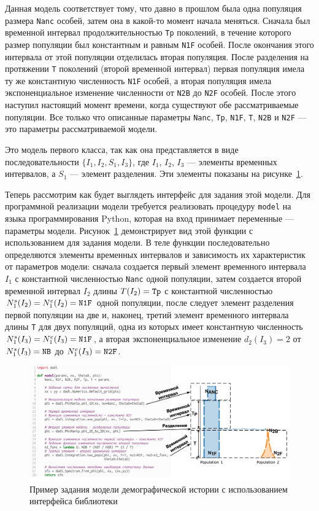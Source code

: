 \documentclass[a4paper,14pt,oneside,openany,article]{memoir}
\begin{document}
Данная модель соответствует тому, что давно в прошлом была одна популяция размера \texttt{Nanc} особей, затем она в какой-то момент начала меняться.
Сначала был временной интервал продолжительностью \texttt{Tp} поколений, в течение которого размер популяции был константным и равным \texttt{N1F} особей.
После окончания этого интервала от этой популяции отделилась вторая популяция.
После разделения на протяжении \texttt{T} поколений (второй временной интервал) первая популяция имела ту же константную численность \texttt{N1F} особей, а вторая популяция имела экспоненциальное изменение численности от \texttt{N2B} до \texttt{N2F} особей.
После этого наступил настоящий момент времени, когда существуют обе рассматриваемые популяции.
Все только что описанные параметры \texttt{Nanc}, \texttt{Tp}, \texttt{N1F}, \texttt{T}, \texttt{N2B} и \texttt{N2F} --- это параметры рассматриваемой модели.

Это модель первого класса, так как она представляется в виде последовательности $\{I_1, I_2, S_1, I_3\}$, где $I_1$, $I_2$, $I_3$ --- элементы временных интервалов, а $S_1$ --- элемент разделения.
Эти элементы показаны на рисунке~\ref{fig:dadi:model_spec}.

Теперь рассмотрим как будет выглядеть интерфейс \dadi для задания этой модели.
Для программной реализации модели требуется реализовать процедуру \texttt{model} на языка программирования Python, которая на вход принимает переменные --- параметры модели.
Рисунок~\ref{fig:dadi:model_spec} демонстрирует вид этой функции с использованием \dadi для задания модели.
В теле функции последовательно определяются элементы временных интервалов и зависимость их характеристик от параметров модели: сначала создается первый элемент временного интервала $I_1$ с константной численностью \texttt{Nanc} одной популяции, затем создается второй временной интервал $I_2$ длины $T(I_2) = \text{\texttt{Tp}}$ с константной численностью $N_1^s(I_2) = N_1^e(I_2) = \text{\texttt{N1F}}$ одной популяции, после следует элемент разделения первой популяции на две и, наконец, третий элемент временного интервала длины \texttt{T} для двух популяций, одна из которых имеет константную численность $N_1^s(I_3) = N_1^e(I_3) = \text{\texttt{N1F}}$, а вторая экспоненциальное изменение $d_2(I_3) = 2$ от $N_1^s(I_3) = \text{\texttt{NB}}$ до $N_1^e(I_3) = \text{\texttt{N2F}}$.
\begin{figure}[h]
    \centering
    \includegraphics[width=\linewidth]{images_2/dadi_model.pdf}
    \caption{Пример задания модели демографической истории с использованием интерфейса библиотеки~\dadi}
    \label{fig:dadi:model_spec}
\end{figure}
\end{document}
